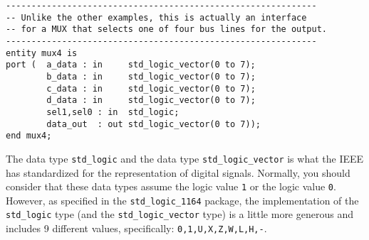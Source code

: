 \begin{minipage}{1\linewidth}
\vspace{5pt}
\centering
{}
\begin{lstlisting}[label=entity_3, caption=Entity declaration with bundles.]
-------------------------------------------------------------
-- Unlike the other examples, this is actually an interface
-- for a MUX that selects one of four bus lines for the output.
-------------------------------------------------------------
entity mux4 is
port (  a_data : in     std_logic_vector(0 to 7);
        b_data : in     std_logic_vector(0 to 7);
        c_data : in     std_logic_vector(0 to 7);
        d_data : in     std_logic_vector(0 to 7);
        sel1,sel0 : in  std_logic;
        data_out  : out std_logic_vector(0 to 7));
end mux4;
\end{lstlisting}
\end{minipage}
The data type \texttt{std\_logic} and the data type \texttt{std\_logic\_vector} is what the IEEE has standardized for the representation of digital signals. Normally, you should consider that these data types assume the logic value \texttt{1} or the logic value \texttt{0}. However, as specified in the \texttt{std\_logic\_1164} package, the implementation of the \texttt{std\_logic} type (and the \texttt{std\_logic\_vector} type) is a little more generous and includes 9 different values, specifically: \texttt{0,1,U,X,Z,W,L,H,-}. 

